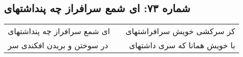 \begin{center}
\section*{شماره ۷۳: ای شمع سرافراز چه پنداشتهای}
\label{sec:073}
\begin{longtable}{l p{0.5cm} r}
ای شمع سرافراز چه پنداشتهای
&&
کز سرکشی خویش سرافراشتهای
\\
در سوختن و بریدن افکندی سر
&&
با خویش همانا که سری داشتهای
\\
\end{longtable}
\end{center}
